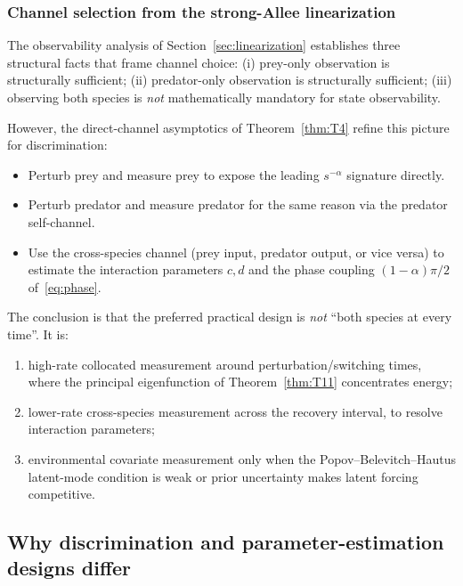\subsubsection*{Channel selection from the strong-Allee linearization}

The observability analysis of Section~\ref{sec:linearization} establishes three structural facts that frame channel choice:
(i) prey-only observation is structurally sufficient;
(ii) predator-only observation is structurally sufficient;
(iii) observing both species is \emph{not} mathematically mandatory for state observability.

However, the direct-channel asymptotics of Theorem~\ref{thm:T4} refine this picture for discrimination:
\begin{itemize}
\item Perturb prey and measure prey to expose the leading \(s^{-\alpha}\) signature directly.
\item Perturb predator and measure predator for the same reason via the predator self-channel.
\item Use the cross-species channel (prey input, predator output, or vice versa) to estimate the interaction parameters \(c, d\) and the phase coupling \((1-\alpha)\pi/2\) of~\eqref{eq:phase}.
\end{itemize}
The conclusion is that the preferred practical design is \emph{not} ``both species at every time''. It is:
\begin{enumerate}
\item high-rate collocated measurement around perturbation/switching times, where the principal eigenfunction of Theorem~\ref{thm:T11} concentrates energy;
\item lower-rate cross-species measurement across the recovery interval, to resolve interaction parameters;
\item environmental covariate measurement only when the Popov--Belevitch--Hautus latent-mode condition is weak or prior uncertainty makes latent forcing competitive.
\end{enumerate}

\subsection{Why discrimination and parameter-estimation designs differ}
\label{sec:disc_vs_param}

